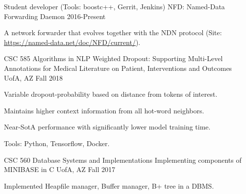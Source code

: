 

\begin{cventries}

\cventry
    {Student developer (Tools: boostc++, Gerrit, Jenkins)} %
    {NFD: Named-Data Forwarding Daemon} %
    {} %
    {2016-Present} %
    {
      \begin{cvitems} %
        \item {A network forwarder that evolves together with the NDN protocol (Site: \url{https://named-data.net/doc/NFD/current/}).}
      \end{cvitems}
    }
    {}

\cventry
    {CSC 585 Algorithms in NLP} %
    {Weighted Dropout: Supporting Multi-Level Annotations for Medical Literature on Patient, Interventions and Outcomes} %
    {UofA, AZ} %
    {Fall 2018} %
    {
      \begin{cvitems} %
        \item {Variable dropout-probability based on distance from tokens of interest.}
        \item {Maintains higher context information from all hot-word neighbors.}
        \item {Near-SotA performance with significantly lower model training time.}
        \item {Tools: Python, Tensorflow, Docker.}
      \end{cvitems}
    }
    {}

  \cventry
    {CSC 560 Database Systems and Implementations} %
    {Implementing components of MINIBASE in C} %
    {UofA, AZ} %
    {Fall 2017} %
    {
      \begin{cvitems} %
        \item {Implemented Heapfile manager, Buffer manager, B+ tree in a DBMS.}
      \end{cvitems}
    }
    {}


\end{cventries}
